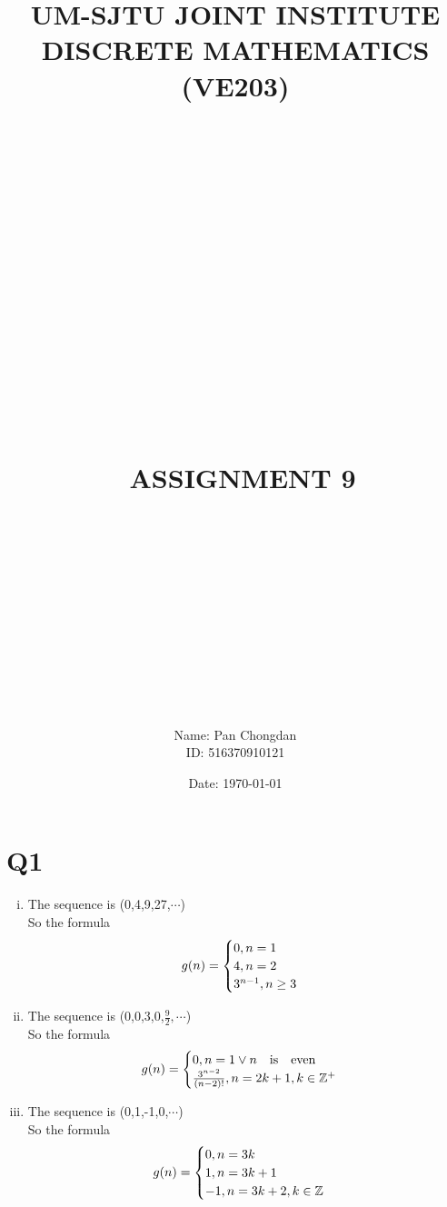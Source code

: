 \documentclass[12pt]{article}
\title{\large UM-SJTU JOINT INSTITUTE\\DISCRETE MATHEMATICS\\(VE203)\\\ \\\ \\\ \\\ \\\ \\\ \\\ \\\ \\\ \\\ \\\
ASSIGNMENT 9\\\ \\\ \\\ \\\ \\\ \\\ }
\author{Name: Pan Chongdan\\ID: 516370910121}
\date{Date: \today}
\begin{document}
\maketitle
\newpage
\section{Q1}
\begin{enumerate}[(i)]
\item
The sequence is (0,4,9,27,$\cdots$)
\\So the formula
\begin{eqnarray}g(n)=
\begin{cases}
0,n=1\cr 4,n=2 \cr 3^{n-1},n\ge 3\end{cases}
\end{eqnarray}
\item
The sequence is (0,0,3,0,$\frac{9}{2},\cdots$)
\\So the formula
\begin{eqnarray}g(n)=
\begin{cases}
0,n=1\vee n\mathrm{\quad is\quad even} \cr \frac{3^{n-2}}{(n-2)!},n=2k+1,k\in\mathbb{Z^+}\end{cases}
\end{eqnarray}
\item
The sequence is (0,1,-1,0,$\cdots$)
\\So the formula
\begin{eqnarray}g(n)=
\begin{cases}
0,n=3k\cr 1,n=3k+1 \cr -1,n=3k+2,k\in\mathbb{Z}\end{cases}
\end{eqnarray}
\end{enumerate}
\end{document}
